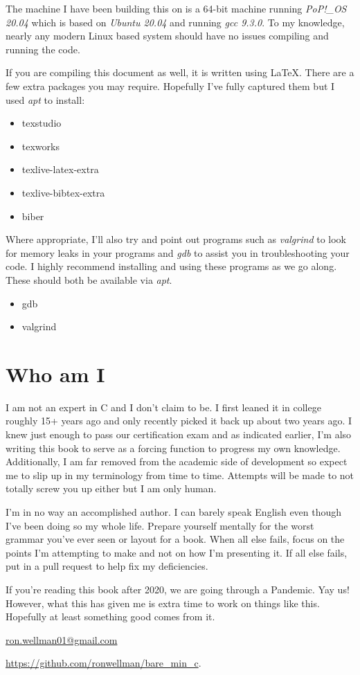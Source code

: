 \documentclass[../main.tex]{subfiles}
\begin{document}
The machine I have been building this on is a 64-bit machine running \emph{PoP!\_OS 20.04} which is based on \emph{Ubuntu 20.04} and running \emph{gcc 9.3.0}.  To my knowledge, nearly any modern Linux based system should have no issues compiling and running the code.  

If you are compiling this document as well, it is written using \LaTeX.  There are a few extra packages you may require.  Hopefully I've fully captured them but I used \textit{apt} to install:
\begin{itemize}
	\item texstudio
	\item texworks
	\item texlive-latex-extra
	\item texlive-bibtex-extra
	\item biber
\end{itemize}

Where appropriate, I'll also try and point out programs such as \textit{valgrind} to look for memory leaks in your programs and \textit{gdb} to assist you in troubleshooting your code. I highly recommend installing and using these programs as we go along.  These should both be available via \textit{apt}.
\begin{itemize}
	\item gdb
	\item valgrind
\end{itemize}

\section{Who am I}
I am not an expert in C and I don't claim to be.  I first leaned it in college roughly 15+ years ago and only recently picked it back up about two years ago.  I knew just enough to pass our certification exam and as indicated earlier, I'm also writing this book to serve as a forcing function to progress my own knowledge.  Additionally, I am far removed from the academic side of development so expect me to slip up in my terminology from time to time.  Attempts will be made to not totally screw you up either but I am only human.

I'm in no way an accomplished author.  I can barely speak English even though I've been doing so my whole life.  Prepare yourself mentally for the worst grammar you've ever seen or layout for a book.  When all else fails, focus on the points I'm attempting to make and not on how I'm presenting it.  If all else fails, put in a pull request to help fix my deficiencies.

If you're reading this book after 2020, we are going through a Pandemic.  Yay us!  However, what this has given me is extra time to work on things like this.  Hopefully at least something good comes from it.

\href{mailto:ron.wellman01@gmail.com}{ron.wellman01@gmail.com}

\href{https://github.com/ronwellman/bare_min_c}{https://github.com/ronwellman/bare\_min\_c}.

\mainmatter
\end{document}

